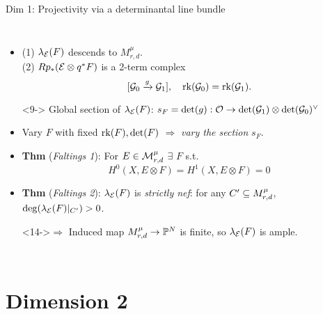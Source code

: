 \documentclass[8pt]{beamer} %
\begin{document}
\begin{frame}[fragile]{Dim 1: Projectivity via a determinantal line bundle}
\begin{columns}[t]
    \begin{itemize}
        \item<8-> (1) $\lambda_{\mathcal{E}}(F)$ descends to $M^\mu_{r,d}$. \\ (2) $R p_* (\mathcal{E} \otimes q^*F)$ is a 2-term complex
        \[ [\mathcal{G}_0 \xrightarrow{g} \mathcal{G}_1], \quad \operatorname{\mathrm{rk}}(\mathcal{G}_0) = \operatorname{\mathrm{rk}}(\mathcal{G}_1). \]
        \item[]<9-> Global section of $\lambda_{\mathcal{E}}(F)$: $s_F = \det(g): \mathcal{O} \to \det(\mathcal{G}_1) \otimes \det(\mathcal{G}_0)^\vee$
        \item<10-> Vary $F$ with fixed $\operatorname{\mathrm{rk}}(F), \det(F)$ $\Rightarrow$ \textit{vary the section} $s_F$.
        \item<11-> \textbf{Thm} (\textit{Faltings 1}): For $E \in \mathcal{M}^\mu_{r,d}$ $\exists$ $F$ s.t.
        \[ H^0(X, E \otimes F) = H^1(X, E \otimes F) = 0 \]
        \item<13-> \textbf{Thm} (\textit{Faltings 2}): $\lambda_{\mathcal{E}}(F)$ is \textit{strictly nef}: for any $C' \subseteq M^\mu_{r,d}$, $\deg(\lambda_{\mathcal{E}}(F)|_{C'}) > 0$.
        \item[]<14->$\Rightarrow$ Induced map $M^\mu_{r,d} \to \mathbb{P}^N$ is finite, so $\lambda_{\mathcal{E}}(F)$ is ample.
    \end{itemize}
\end{columns}
\end{frame}

\section{Dimension 2}
\end{document}
